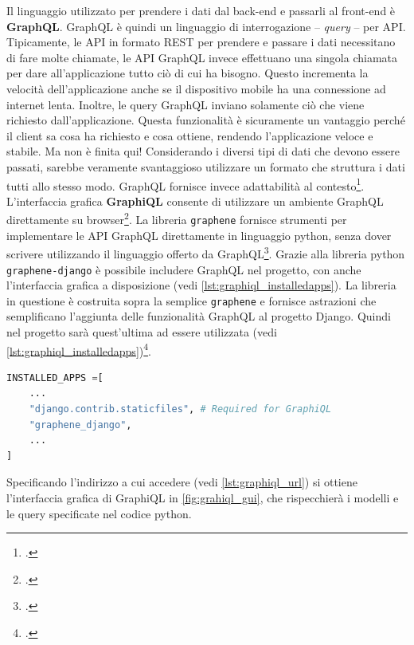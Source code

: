 \documentclass[./main.tex]{subfiles}
\begin{document}
Il linguaggio utilizzato per prendere i dati dal back-end e passarli al front-end è \textbf{GraphQL}. GraphQL è quindi un linguaggio di interrogazione -- \textit{query} -- per API. Tipicamente, le API in formato REST per prendere e passare i dati necessitano di fare molte chiamate, le API GraphQL invece effettuano una singola chiamata per dare all'applicazione tutto ciò di cui ha bisogno. Questo incrementa la velocità dell'applicazione anche se il dispositivo mobile ha una connessione ad internet lenta. Inoltre, le query GraphQL inviano solamente ciò che viene richiesto dall'applicazione. Questa funzionalità è sicuramente un vantaggio perché il client sa cosa ha richiesto e cosa ottiene, rendendo l'applicazione veloce e stabile. Ma non è finita qui! Considerando i diversi tipi di dati che devono essere passati, sarebbe veramente svantaggioso utilizzare un formato che struttura i dati tutti allo stesso modo. GraphQL fornisce invece adattabilità al contesto\footcite[\url{https://graphql.org/}]{website-graphql}. L'interfaccia grafica \textbf{GraphiQL} consente di utilizzare un ambiente GraphQL direttamente su browser\footcite[\url{https://github.com/graphql/graphiql?tab=readme-ov-file\#graphiql}]{website-graphiql}. La libreria \lstinline{graphene} fornisce strumenti per implementare le API GraphQL direttamente in linguaggio python, senza dover scrivere utilizzando il linguaggio offerto da GraphQL\footcite[\url{https://docs.graphene-python.org/en/latest/quickstart/}]{website-graphene-docs}. Grazie alla libreria python \lstinline{graphene-django} è possibile includere GraphQL nel progetto, con anche l'interfaccia grafica a disposizione (vedi \autoref{lst:graphiql_installedapps}). La libreria in questione è costruita sopra la semplice \lstinline{graphene} e fornisce astrazioni che semplificano l'aggiunta delle funzionalità GraphQL al progetto Django. Quindi nel progetto sarà quest'ultima ad essere utilizzata (vedi \autoref{lst:graphiql_installedapps})\footcite[\url{https://docs.graphene-python.org/projects/django/en/latest/}]{website-graphene-docs}.\par

\begin{lstlisting}[language=Python, caption=settings.py, label=lst:graphiql_installedapps]
INSTALLED_APPS =[
    ...
    "django.contrib.staticfiles", # Required for GraphiQL
    "graphene_django",
    ...
]
\end{lstlisting}

Specificando l'indirizzo a cui accedere (vedi \autoref{lst:graphiql_url}) si ottiene l'interfaccia grafica di GraphiQL in \autoref{fig:grahiql_gui}, che rispecchierà i modelli e le query specificate nel codice python.\par
\end{document}
